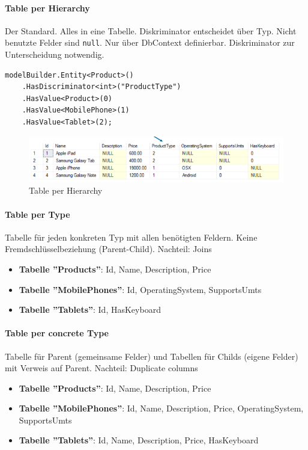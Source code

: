 \documentclass[
a4paper,
oneside,
10pt,
fleqn,
headsepline,
toc=listofnumbered, 
bibliography=totocnumbered]{scrartcl}
\begin{document}
\paragraph{Table per Hierarchy} Der Standard. Alles in eine Tabelle. Diskriminator entscheidet über Typ. Nicht benutzte Felder sind \lstinline|null|. Nur über DbContext definierbar. Diskriminator zur Unterscheidung notwendig.
\begin{lstlisting}
modelBuilder.Entity<Product>()
    .HasDiscriminator<int>("ProductType")
    .HasValue<Product>(0)
    .HasValue<MobilePhone>(1)
    .HasValue<Tablet>(2);
\end{lstlisting}
\begin{figure}[!ht]
	\centering
	\includegraphics[width=0.8\linewidth]{images/table_per_hierarchy.png}
	\caption{Table per Hierarchy}
\end{figure}

\paragraph{Table per Type} Tabelle für jeden konkreten Typ mit allen benötigten Feldern. Keine Fremdschlüsselbeziehung (Parent-Child). Nachteil: Joins
\begin{itemize}
	\item \textbf{Tabelle ''Products''}: Id, Name, Description, Price
	\item \textbf{Tabelle ''MobilePhones''}: Id, OperatingSystem, SupportsUmts
	\item \textbf{Tabelle ''Tablets''}: Id, HasKeyboard
\end{itemize}

\paragraph{Table per concrete Type} Tabelle für Parent (gemeinsame Felder) und Tabellen für Childs (eigene Felder) mit Verweis auf Parent. Nachteil: Duplicate columns
\begin{itemize}
	\item \textbf{Tabelle ''Products''}: Id, Name, Description, Price
	\item \textbf{Tabelle ''MobilePhones''}: Id, Name, Description, Price, OperatingSystem, SupportsUmts
	\item \textbf{Tabelle ''Tablets''}: Id, Name, Description, Price, HasKeyboard
\end{itemize}
\end{document}
